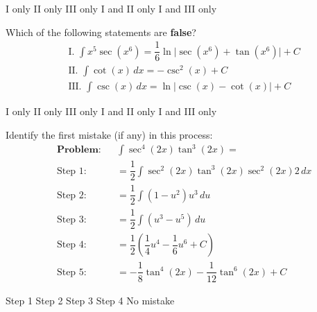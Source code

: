 \begin{questions}
    \begin{oneparchoices}
        \choice I only 
        \choice II only
        \choice III only 
        \choice I and II only
        \choice I and III only
    \end{oneparchoices} \par \horizontalline

    \question Which of the following statements are \textbf{false}? \begin{align*}
        & \text{I. } \int x^5\sec \left(x^6\right) = \dfrac{1}{6}\ln \bigg|\sec \left(x^6\right) + \tan \left(x^6\right)\bigg| + C \\[11pt]
        & \text{II. } \int \cot (x) \, dx = -\csc^2 (x) + C \\[11pt]
        & \text{III. } \int \csc (x) \, dx = \ln |\csc (x) - \cot (x)| + C
    \end{align*}

    \begin{oneparchoices}
        \choice I only 
        \choice II only
        \choice III only 
        \choice I and II only
        \choice I and III only
    \end{oneparchoices} \par \horizontalline

    \question Identify the first mistake (if any) in this process: \begin{align*}
        & \textbf{Problem:} && \int \sec^4 (2x)\tan^3 (2x) = \\[11pt]
        & \text{Step 1:} && = \dfrac{1}{2}\int \sec^2 (2x)\tan^3 (2x)\sec^2 (2x)2 \, dx \\[5.5pt]
        & \text{Step 2:} && = \dfrac{1}{2}\int \left(1 - u^2\right)u^3 \, du \\[5.5pt]
        & \text{Step 3:} && = \dfrac{1}{2}\int \left(u^3 - u^5\right) \, du \\[5.5pt]
        & \text{Step 4:} && = \dfrac{1}{2}\left(\dfrac{1}{4}u^4 - \dfrac{1}{6}u^6 + C\right) \\[5.5pt]
        & \text{Step 5:} && = -\dfrac{1}{8}\tan^4 (2x) - \dfrac{1}{12}\tan^6 (2x) + C
    \end{align*}

    \begin{oneparchoices}
        \choice Step 1
        \choice Step 2
        \choice Step 3
        \choice Step 4
        \choice No mistake
    \end{oneparchoices} \par \horizontalline
\end{questions}